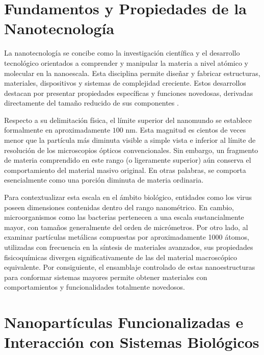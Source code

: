\section{Fundamentos y Propiedades de la Nanotecnología}

La nanotecnología se concibe como la investigación científica y el desarrollo tecnológico orientados a comprender y manipular la materia a nivel atómico y molecular en la nanoescala. Esta disciplina permite diseñar y fabricar estructuras, materiales, dispositivos y sistemas de complejidad creciente. Estos desarrollos destacan por presentar propiedades específicas y funciones novedosas, derivadas directamente del tamaño reducido de sus componentes \cite{domingo2010nanotecnologia}.

Respecto a su delimitación física, el límite superior del nanomundo se establece formalmente en aproximadamente $100\text{ nm}$. Esta magnitud es cientos de veces menor que la partícula más diminuta visible a simple vista e inferior al límite de resolución de los microscopios ópticos convencionales. Sin embargo, un fragmento de materia comprendido en este rango (o ligeramente superior) aún conserva el comportamiento del material masivo original. En otras palabras, se comporta esencialmente como una porción diminuta de materia ordinaria.

Para contextualizar esta escala en el ámbito biológico, entidades como los virus poseen dimensiones contenidas dentro del rango nanométrico. En cambio, microorganismos como las bacterias pertenecen a una escala sustancialmente mayor, con tamaños generalmente del orden de micrómetros. Por otro lado, al examinar partículas metálicas compuestas por aproximadamente 1000 átomos, utilizadas con frecuencia en la síntesis de materiales avanzados, sus propiedades fisicoquímicas divergen significativamente de las del material macroscópico equivalente. Por consiguiente, el ensamblaje controlado de estas nanoestructuras para conformar sistemas mayores permite obtener materiales con comportamientos y funcionalidades totalmente novedosos.
\section{Nanopartículas Funcionalizadas e Interacción con Sistemas Biológicos}

